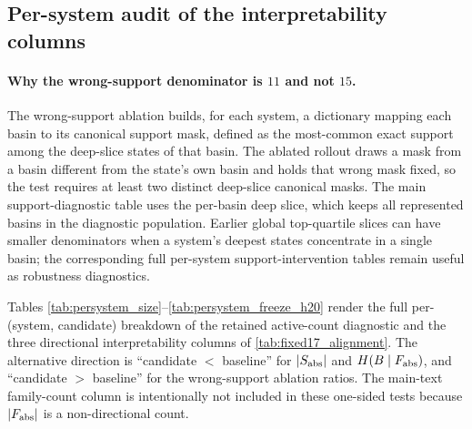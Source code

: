 \begin{table}[tbp]
\centering
\caption{Per-system effect sizes and Holm-corrected Wilcoxon \(p\)-values at \(H=1000\) on the \(15\)-system multibasin benchmark. This is the numerical version of the forest plot in \cref{fig:fixed17_forest}. Format identical to \cref{tab:persystem_h100}.}
\label{tab:persystem_h1000}
\setlength{\tabcolsep}{3pt}
\resizebox{\textwidth}{!}{}
\end{table}

\subsection*{Per-system audit of the interpretability columns}

\paragraph{Why the wrong-support denominator is \(11\) and not \(15\).}
The wrong-support ablation builds, for each system, a dictionary mapping each basin to its canonical support mask, defined as the most-common exact support among the deep-slice states of that basin. The ablated rollout draws a mask from a basin different from the state's own basin and holds that wrong mask fixed, so the test requires at least two distinct deep-slice canonical masks. The main support-diagnostic table uses the per-basin deep slice, which keeps all represented basins in the diagnostic population. Earlier global top-quartile slices can have smaller denominators when a system's deepest states concentrate in a single basin; the corresponding full per-system support-intervention tables remain useful as robustness diagnostics.

Tables \ref{tab:persystem_size}--\ref{tab:persystem_freeze_h20} render the full per-(system, candidate) breakdown of the retained active-count diagnostic and the three directional interpretability columns of \cref{tab:fixed17_alignment}. The alternative direction is ``candidate \(<\) baseline'' for \(|S_{\rm abs}|\) and \(H(B\mid F_{\rm abs})\), and ``candidate \(>\) baseline'' for the wrong-support ablation ratios. The main-text family-count column is intentionally not included in these one-sided tests because \(|F_{\rm abs}|\) is a non-directional count.

\begin{table}[tbp]
\centering
\caption{Per-system effect sizes and Holm-corrected Wilcoxon \(p\)-values for \(|S_{\rm abs}|\), the mean active-coordinate count under the absolute-threshold support on the deep slice. Alternative: candidate \(|S_{\rm abs}|<\) baseline \(|S_{\rm abs}|\).}
\label{tab:persystem_size}
\setlength{\tabcolsep}{3pt}
\resizebox{\textwidth}{!}{}
\end{table}


